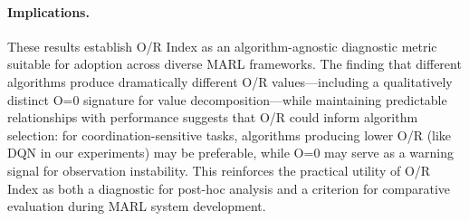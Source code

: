 \paragraph{Implications.}
These results establish O/R Index as an algorithm-agnostic diagnostic metric suitable for adoption across diverse MARL frameworks. The finding that different algorithms produce dramatically different O/R values—including a qualitatively distinct O=0 signature for value decomposition—while maintaining predictable relationships with performance suggests that O/R could inform algorithm selection: for coordination-sensitive tasks, algorithms producing lower O/R (like DQN in our experiments) may be preferable, while O=0 may serve as a warning signal for observation instability. This reinforces the practical utility of O/R Index as both a diagnostic for post-hoc analysis and a criterion for comparative evaluation during MARL system development.
